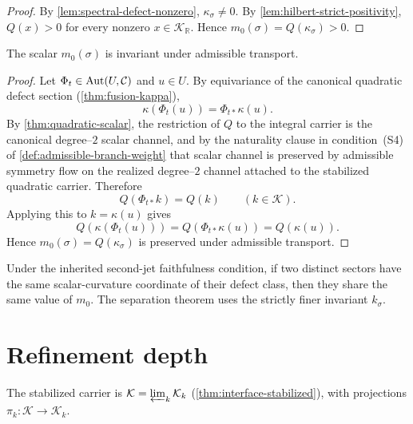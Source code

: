 \begin{proof}
By \cref{lem:spectral-defect-nonzero}, $\kappa_\sigma \neq 0$.
By \cref{lem:hilbert-strict-positivity}, $Q(x) > 0$ for every nonzero
$x \in \mathcal K_{\mathbb R}$.
Hence $m_0(\sigma) = Q(\kappa_\sigma) > 0$.
\end{proof}

\begin{theorem}
\label{thm:spectral-scalar-invariant}
The scalar $m_0(\sigma)$ is invariant under admissible transport.
\end{theorem}

\begin{proof}
Let $\Phi_t \in \operatorname{Aut}(U,\mathcal C)$ and $u \in U$.
By equivariance of the canonical quadratic defect section
(\cref{thm:fusion-kappa}),
\[
  \kappa(\Phi_t(u)) = \Phi_{t*}\kappa(u).
\]
By \cref{thm:quadratic-scalar}, the restriction of $Q$ to the integral
carrier is the canonical degree--\(2\) scalar channel, and by the
naturality clause in condition~\textup{(S4)} of
\cref{def:admissible-branch-weight} that scalar channel is preserved by
admissible symmetry flow on the realized degree--\(2\) channel attached
to the stabilized quadratic carrier. Therefore
\[
  Q(\Phi_{t*}k)=Q(k)
  \qquad
  (k\in \mathcal K).
\]
Applying this to $k=\kappa(u)$ gives
\[
  Q(\kappa(\Phi_t(u)))
  =
  Q(\Phi_{t*}\kappa(u))
  =
  Q(\kappa(u)).
\]
Hence $m_0(\sigma) = Q(\kappa_\sigma)$ is preserved under admissible
transport.
\end{proof}

\begin{remark}
\label{rem:m0-not-injective}
Under the inherited second-jet faithfulness condition, if two distinct
sectors have the same scalar-curvature coordinate of their defect
class, then they share the same value of $m_0$.
The separation theorem uses the strictly finer invariant $k_\sigma$.
\end{remark}

\section{Refinement depth}
\label{sec:spectral-depth}

The stabilized carrier is $\mathcal K = \varprojlim_k \mathcal K_k$
(\cref{thm:interface-stabilized}), with projections
$\pi_k : \mathcal K \to \mathcal K_k$.

